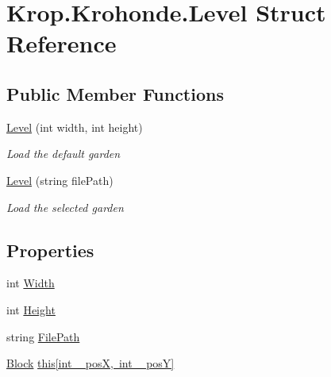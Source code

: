 \hypertarget{struct_krop_1_1_krohonde_1_1_level}{}\section{Krop.\+Krohonde.\+Level Struct Reference}
\label{struct_krop_1_1_krohonde_1_1_level}
\subsection*{Public Member Functions}
\begin{DoxyCompactItemize}
\item 
\mbox{\hyperlink{struct_krop_1_1_krohonde_1_1_level_aac39539c546fa2284e8ff762b4898c98}{Level}} (int width, int height)
\begin{DoxyCompactList}\small\item\em Load the default garden \end{DoxyCompactList}\item 
\mbox{\hyperlink{struct_krop_1_1_krohonde_1_1_level_a1e442ecde4d1692da04bb530c451d421}{Level}} (string file\+Path)
\begin{DoxyCompactList}\small\item\em Load the selected garden \end{DoxyCompactList}\end{DoxyCompactItemize}
\subsection*{Properties}
\begin{DoxyCompactItemize}
\item 
int \mbox{\hyperlink{struct_krop_1_1_krohonde_1_1_level_a44e520a8301e4f9d46b1b0feee4a7e9d}{Width}}
\item 
int \mbox{\hyperlink{struct_krop_1_1_krohonde_1_1_level_a9a6ee04aee1439f061009af27688d39f}{Height}}
\item 
string \mbox{\hyperlink{struct_krop_1_1_krohonde_1_1_level_a13ed09516431dcc51e4ee6dad01afdb1}{File\+Path}}
\item 
\mbox{\hyperlink{struct_krop_1_1_krohonde_1_1_block}{Block}} \mbox{\hyperlink{struct_krop_1_1_krohonde_1_1_level_aa12f79d6846914cf1ed7dcd7f5d99f70}{this\mbox{[}int \+\_\+pos\+X, int \+\_\+pos\+Y\mbox{]}}}
\end{DoxyCompactItemize}


